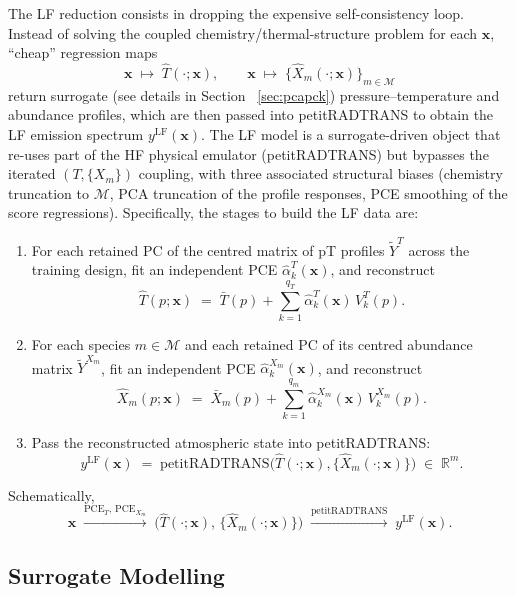\documentclass[11pt,a4paper]{article}
\newcommand{\thref}[1]{{\color{teal}\textit{Thesis: #1}}}
\newcommand{\xv}{\bm{x}}
\newcommand{\ylf}{y^{\mathrm{LF}}}
\begin{document}
The LF reduction consists in dropping the expensive self-consistency loop. Instead of solving the coupled chemistry/thermal-structure problem for each $\xv$, ``cheap'' regression maps 
\[
\xv \;\longmapsto\; \hat T(\cdot;\xv), \qquad
\xv \;\longmapsto\; \{\hat X_{m}(\cdot;\xv)\}_{m\in\mathcal{M}}
\]
return surrogate (see details in Section ~\ref{sec:pcapck}) pressure--temperature and abundance profiles, which
are then passed into petitRADTRANS to obtain the LF emission spectrum
$\ylf(\xv)$. The LF model is a surrogate-driven object that re-uses part of the HF physical emulator (petitRADTRANS) but bypasses
the iterated $(T,\{X_{m}\})$ coupling, with three associated structural
biases (chemistry truncation to $\mathcal{M}$, PCA truncation of the
profile responses, PCE smoothing of the score regressions).
Specifically, the stages to build the LF data are:
\begin{enumerate}[leftmargin=2em,itemsep=0.2em]
  \item For each retained PC of the centred matrix of pT profiles
        $\tilde Y^{T}$ across the training design, fit an independent
        PCE $\hat\alpha^{T}_{k}(\xv)$, and reconstruct
        \[
        \hat T(p;\xv) \;=\; \bar T(p) + \sum_{k=1}^{q_{T}}
        \hat\alpha^{T}_{k}(\xv)\,V^{T}_{k}(p).
        \]
  \item For each species $m \in \mathcal{M}$ and each retained PC of
        its centred abundance matrix $\tilde Y^{X_{m}}$, fit an
        independent PCE $\hat\alpha^{X_{m}}_{k}(\xv)$, and reconstruct
        \[
        \hat X_{m}(p;\xv) \;=\; \bar X_{m}(p) + \sum_{k=1}^{q_{m}}
        \hat\alpha^{X_{m}}_{k}(\xv)\,V^{X_{m}}_{k}(p).
        \]
  \item Pass the reconstructed atmospheric state into petitRADTRANS:
        \[
        \ylf(\xv) \;=\;
        \mathrm{petitRADTRANS}\!\bigl(\hat T(\cdot;\xv),
        \{\hat X_{m}(\cdot;\xv)\}\bigr)
        \;\in\; \mathbb{R}^{m}.
        \]
\end{enumerate}
Schematically,
\[
\xv \;\xrightarrow{\text{PCE}_{T},\,\text{PCE}_{X_{m}}}\;
\bigl(\hat T(\cdot;\xv),\,\{\hat X_{m}(\cdot;\xv)\}\bigr)
\;\xrightarrow{\text{petitRADTRANS}}\; \ylf(\xv).
\]

\subsection{Surrogate Modelling}
\end{document}
